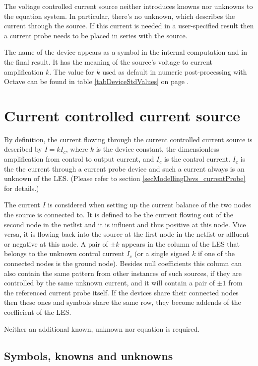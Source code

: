 The voltage controlled current source neither introduces knowns nor
unknowns to the equation system. In particular, there's no unknown, which
describes the current through the source. If this current is needed in a
user-specified result then a current probe needs to be placed in series
with the source.

The name of the device appears as a symbol in the internal computation and in
the final result. It has the meaning of the source's voltage to current
amplification $k$. The value for $k$ used as default in numeric
post-processing with Octave can be found in table \ref{tabDeviceStdValues}
on page \pageref{tabDeviceStdValues}.


\section{Current controlled current source}

By definition, the current flowing through the current controlled current
source is described by $I = kI_c$, where $k$ is the device constant, the
dimensionless amplification from control to output current, and $I_c$ is
the control current. $I_c$ is the the current through a current probe
device and such a current always is an unknown of the LES. (Please refer
to section \ref{secModellingDevs_currentProbe} for details.)

The current $I$ is considered when setting up the current balance of the
two nodes the source is connected to. It is defined to be the current
flowing out of the second node in the netlist and it is influent and thus
positive at this node. Vice versa, it is flowing back into the source at
the first node in the netlist or affluent or negative at this node. A pair
of $\pm k$ appears in the column of the LES that belongs to the unknown
control current $I_c$ (or a single signed $k$ if one of the connected
nodes is the ground node). Besides null coefficients this column can also
contain the same pattern from other instances of such sources, if they are
controlled by the same unknown current, and it will contain a pair of $\pm
1$ from the referenced current probe itself. If the devices share their
connected nodes then these ones and symbols share the same row, they
become addends of the coefficient of the LES.

Neither an additional known, unknown nor equation is required.


\subsection{Symbols, knowns and unknowns}

